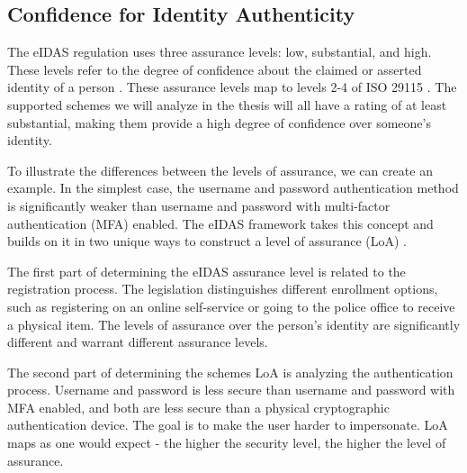 

\subsection{Confidence for Identity Authenticity}

The eIDAS regulation uses three assurance levels: low, substantial, and high. These levels refer to the degree of confidence about the claimed or asserted identity of a person \cite{eulaw-eidas}. These assurance levels map to levels 2-4 of ISO 29115 \cite{iso29115}. The supported schemes we will analyze in the thesis will all have a rating of at least substantial, making them provide a high degree of confidence over someone's identity.

To illustrate the differences between the levels of assurance, we can create an example. In the simplest case, the {username and password} authentication method is significantly weaker than {username and password} with multi-factor authentication (MFA) enabled. The eIDAS framework takes this concept and builds on it in two unique ways to construct a level of assurance (LoA) \cite{eulaw-eidas-loa}.

The first part of determining the eIDAS assurance level is related to the registration process. The legislation distinguishes different enrollment options, such as registering on an online self-service or going to the police office to receive a physical item. The levels of assurance over the person's identity are significantly different and warrant different assurance levels.

The second part of determining the schemes LoA is analyzing the authentication process. {Username and password} is less secure than {username and password} with MFA enabled, and both are less secure than a physical cryptographic authentication device. The goal is to make the user harder to impersonate. LoA maps as one would expect - the higher the security level, the higher the level of assurance.

